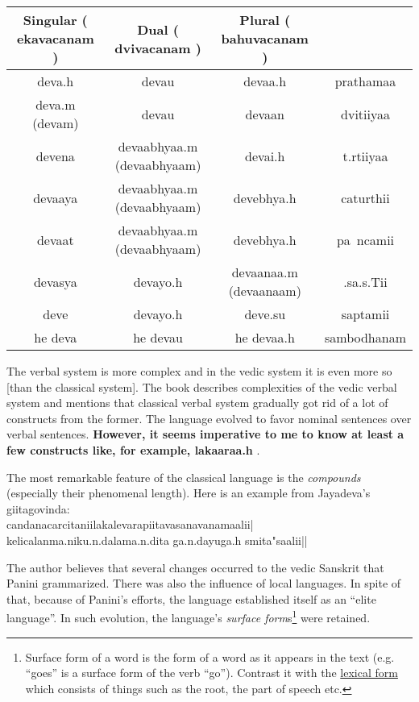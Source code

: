 \documentclass[a4paper, 12pt]{article}
\newcommand \sans[1]{
    \textsanskrit{#1}
}
\begin{document}
\begin{table}[h]
    \centering
\begin{tabular}{|c|c|c|c|}
    \hline 
    Singular (\sans{ekavacanam}) & Dual (\sans{dvivacanam}) & Plural (\sans{bahuvacanam}) &\\
\hline
    \sans{deva.h} & \sans{devau} & \sans{devaa.h} & \sans{prathamaa}\\
\hline
    \sans{deva.m (devam)} & \sans{devau} & \sans{devaan} & \sans{dvitiiyaa}\\
\hline
    \sans{devena} & \sans{devaabhyaa.m (devaabhyaam)} & \sans{devai.h} & \sans{t.rtiiyaa}\\
\hline
    \sans{devaaya} & \sans{devaabhyaa.m (devaabhyaam)} & \sans{devebhya.h} & \sans{caturthii}\\
\hline
    \sans{devaat} & \sans{devaabhyaa.m (devaabhyaam)} & \sans{devebhya.h} & \sans{pa~ncamii}\\
\hline
    \sans{devasya} & \sans{devayo.h} & \sans{devaanaa.m (devaanaam)} & \sans{.sa.s.Tii}\\
\hline
    \sans{deve} & \sans{devayo.h} & \sans{deve.su} & \sans{saptamii}\\
\hline
    \sans{he deva} & \sans{he devau} & \sans{he devaa.h} & \sans{sambodhanam}\\
\hline
\end{tabular}
\end{table}


    The verbal system is more complex and in the vedic system it is even more so [than the classical system]. The book describes complexities of the vedic verbal system and mentions that classical verbal system gradually got rid of a lot of constructs from the former. The language evolved to favor nominal sentences over verbal sentences. \textbf{However, it seems imperative to me to know at least a few constructs like, for example, \sans{lakaaraa.h}}.


    The most remarkable feature of the classical language is the \emph{compounds} (especially their phenomenal length). Here is an example from Jayadeva's \sans{giitagovinda: \\
    candanacarcitaniilakalevarapiitavasanavanamaalii|\\
    kelicalanma.niku.n.dalama.n.dita ga.n.dayuga.h smita"saalii||\\
    }

  The author believes that several changes occurred to the vedic Sanskrit that Panini grammarized. There was also the influence of local languages. In spite of that, because of Panini's efforts, the language established itself as an ``elite language''. In such evolution, the language's \emph{surface form}s\footnote{Surface form of a word is the form of a word as it appears in the text (e.g. ``goes'' is a surface form of the verb ``go''). Contrast it with the \href{https://wiki.apertium.org/wiki/Lexical_form}{lexical form} which consists of things such as the root, the part of speech etc.} were retained.
\end{document}

